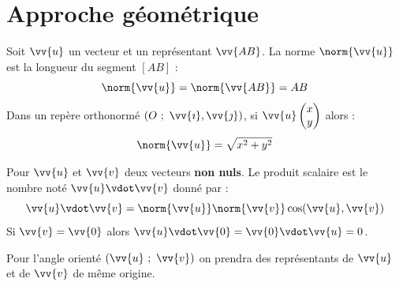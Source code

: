 \documentclass[main.tex]{subfiles}
\begin{document}
\section{Approche géométrique} 
\begin{definition}[Norme] Soit $\vv{u}$ un vecteur et un représentant $\vv{AB}$. La norme $\norm{\vv{u}}$ est la longueur du segment $[AB]$ :
	\setlength{\abovedisplayskip}{3pt}
	\setlength{\belowdisplayskip}{3pt}
	$$
	\norm{\vv{u}}=\norm{\vv{AB}}=AB
	$$
\noindent Dans un repère orthonormé $(O~;~\vv{\imath},\vv{\jmath})$, si $\vv{u}\begin{pmatrix}
	x\\y
\end{pmatrix}$ alors :
\setlength{\abovedisplayskip}{3pt}
\setlength{\belowdisplayskip}{3pt}
$$
\norm{\vv{u}}=\sqrt{x^2+y^2}
$$
\end{definition} 
\begin{definition} Pour $\vv{u}$ et $\vv{v}$ deux vecteurs \textbf{non nuls}. Le produit scalaire est le nombre noté $\vv{u}\vdot\vv{v}$ donné par :
	\setlength{\abovedisplayskip}{3pt}
	\setlength{\belowdisplayskip}{3pt}
	$$
	\vv{u}\vdot\vv{v}=\norm{\vv{u}}\norm{\vv{v}}\cos(\vv{u},\vv{v})
	$$
Si $\vv{v}=\vv{0}$ alors  $\vv{u}\vdot \vv{0}=\vv{0}\vdot \vv{u}=0$.
\end{definition}
\begin{remark} Pour l'angle orienté $(\vv{u}~;~\vv{v})$ on prendra des représentants de $\vv{u}$ et de $\vv{v}$ de même origine. 
\end{remark}
\end{document}
